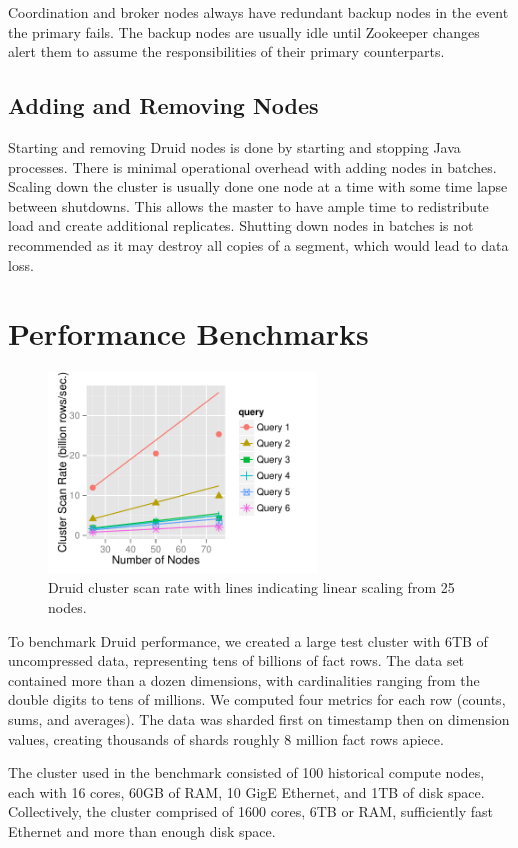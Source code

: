 \documentclass{vldb}
\begin{document}
Coordination and broker nodes always have redundant backup nodes in the event
the primary fails. The backup nodes are usually idle until Zookeeper changes alert
them to assume the responsibilities of their primary counterparts.

\subsection{Adding and Removing Nodes}
Starting and removing Druid nodes is done by starting and stopping Java processes. There is minimal
operational overhead with adding nodes in batches. Scaling down the
cluster is usually done one node at a time with some time lapse
between shutdowns. This allows the master to have ample time to
redistribute load and create additional replicates. Shutting down
nodes in batches is not recommended as it may destroy all
copies of a segment, which would lead to data loss.

\section{Performance Benchmarks}
\label{sec:benchmarks}
\begin{figure}
\centering
\includegraphics[width = 2.8in]{cluster_scan_rate}
\caption{Druid cluster scan rate with lines indicating linear scaling
  from 25 nodes.}
\label{fig:cluster_scan_rate}
\end{figure}
To benchmark Druid performance, we created a large test cluster with
6TB of uncompressed data, representing tens of billions of fact
rows. The data set contained more than a dozen dimensions, with
cardinalities ranging from the double digits to tens of millions. We computed
four metrics for each row (counts, sums, and averages). The data was
sharded first on timestamp then on dimension values, creating
thousands of shards roughly 8 million fact rows apiece.

The cluster used in the benchmark consisted of 100 historical compute
nodes, each with 16 cores, 60GB of RAM, 10 GigE Ethernet, and 1TB of
disk space. Collectively, the cluster comprised of 1600 cores, 6TB or
RAM, sufficiently fast Ethernet and more than enough disk space.
\end{document}
